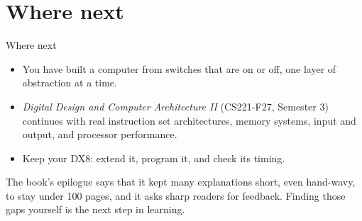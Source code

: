 \documentclass[10pt]{wosm-slides}
\begin{document}
\section{Where next}

\begin{frame}{Where next}
  \begin{itemize}
    \item You have built a computer from switches that are on or off, one layer of
      abstraction at a time.
    \item \emph{Digital Design and Computer Architecture II} (CS221-F27, Semester 3)
      continues with real instruction set architectures, memory systems, input and
      output, and processor performance.
    \item Keep your DX8: extend it, program it, and check its timing.
  \end{itemize}

  \begin{remark}
    The book's epilogue says that it kept many explanations short, even hand-wavy, to
    stay under 100 pages, and it asks sharp readers for feedback. Finding those gaps
    yourself is the next step in learning.
  \end{remark}
\end{frame}
\end{document}
